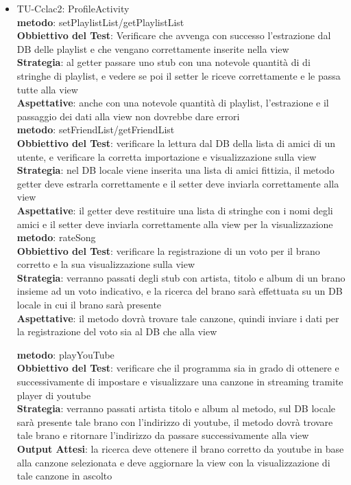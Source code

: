 \begin{itemize}

\item TU-Cclac2:  ProfileActivity\\
\textbf{metodo}: setPlaylistList/getPlaylistList\\
\textbf{Obbiettivo del Test}: Verificare che avvenga con successo l'estrazione dal DB
delle playlist e che vengano correttamente inserite nella view\\
\textbf{Strategia}: al getter passare uno stub con una notevole quantit\`a di di stringhe di playlist,
 e vedere se poi il setter le riceve correttamente e le passa tutte alla view\\
\textbf{Aspettative}: anche con una notevole quantit\`a di playlist,
l'estrazione e il passaggio dei dati alla view non dovrebbe dare errori\\

\textbf{metodo}: setFriendList/getFriendList\\
\textbf{Obbiettivo del Test}: verificare la lettura dal DB della lista di amici di un
utente, e verificare la corretta importazione e visualizzazione sulla view\\
\textbf{Strategia}: nel DB locale viene inserita una lista di amici
fittizia, il metodo getter deve estrarla correttamente e il setter deve inviarla
correttamente alla view\\
\textbf{Aspettative}: il getter deve restituire una lista di stringhe con i nomi degli amici e il setter deve inviarla correttamente alla view per la visualizzazione\\


\textbf{metodo}: rateSong\\
\textbf{Obbiettivo del Test}: verificare la registrazione di un voto per il
brano corretto e la sua visualizzazione sulla view\\
\textbf{Strategia}: verranno passati degli stub con artista, titolo e album di
un brano insieme ad un voto indicativo, e la ricerca del brano sar\`a
effettuata su un DB locale in cui il brano sar\`a presente\\
\textbf{Aspettative}: il metodo dovr\`a trovare tale canzone, quindi inviare i
dati per la registrazione del voto sia al DB che alla view

\textbf{metodo}: playYouTube\\
\textbf{Obbiettivo del Test}: verificare che il
programma sia in grado di ottenere e successivamente di impostare e visualizzare una canzone in streaming tramite
player di youtube\\
\textbf{Strategia}: verranno passati artista titolo e album al metodo, sul DB
locale sar\`a presente tale brano con l'indirizzo di youtube, il metodo
dovr\`a trovare tale brano e ritornare l'indirizzo da passare successivamente
alla view\\
\textbf{Output Attesi}: la ricerca deve ottenere il brano corretto
da youtube in base alla canzone selezionata e deve aggiornare la view con la visualizzazione di tale canzone in ascolto \\


\end{itemize}
